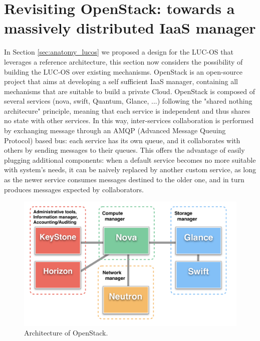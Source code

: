 \section{Revisiting OpenStack: towards a massively distributed IaaS manager}


In Section \ref{sec:anatomy_lucos} we proposed a design for the LUC-OS 
that leverages a reference architecture, this section now considers the 
possibility of building the LUC-OS over existing mechanisms. OpenStack is an 
open-source project that aims at developing a self sufficient IaaS manager, 
containing all mechanisms that are suitable to build a private Cloud. OpenStack 
is composed of several services (nova, swift, Quantum, Glance, ...) following 
the "shared nothing architecure" principle, meaning that each service is 
independent and thus shares no state with other services. In this way, 
inter-services collaboration is performed by exchanging message through an AMQP 
(Advanced Message Queuing Protocol) based bus: each service has its own queue, 
and it collaborates with others by sending messages to their queues. This offers
the advantage of easily plugging additional components: when a default service 
becomes no more suitable with system's needs, it can be naively replaced by 
another custom service, as long as the newer service consumes messages destined 
to the older one, and in turn produces messages expected by collaborators.


\begin{figure}
	\centerline{
	 \includegraphics[width=0.75\linewidth]{Figures/openstack_architecture.pdf}
  }
	\caption{Architecture of OpenStack.}%
	\label{fig:openstack_architecture}%
\end{figure}


